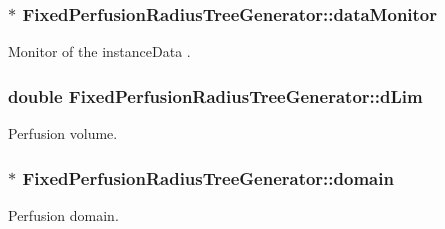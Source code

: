 \subsubsection[{\texorpdfstring{data\+Monitor}{dataMonitor}}]{$\ast$ Fixed\+Perfusion\+Radius\+Tree\+Generator\+::data\+Monitor\hspace{0.3cm}{\ttfamily [private]}}\hypertarget{class_fixed_perfusion_radius_tree_generator_a431e0e44437bc9cbee263ab316c8ed60}{}\label{class_fixed_perfusion_radius_tree_generator_a431e0e44437bc9cbee263ab316c8ed60}
Monitor of the {\ttfamily instance\+Data} . 
\subsubsection[{\texorpdfstring{d\+Lim}{dLim}}]{\setlength{\rightskip}{0pt plus 5cm}double Fixed\+Perfusion\+Radius\+Tree\+Generator\+::d\+Lim\hspace{0.3cm}{\ttfamily [private]}}\hypertarget{class_fixed_perfusion_radius_tree_generator_ae14a2fd89b3e87d51d8d304abab238be}{}\label{class_fixed_perfusion_radius_tree_generator_ae14a2fd89b3e87d51d8d304abab238be}
Perfusion volume. 
\subsubsection[{\texorpdfstring{domain}{domain}}]{$\ast$ Fixed\+Perfusion\+Radius\+Tree\+Generator\+::domain\hspace{0.3cm}{\ttfamily [private]}}\hypertarget{class_fixed_perfusion_radius_tree_generator_a3f613d457aa40ecbec9c61b0fd559764}{}\label{class_fixed_perfusion_radius_tree_generator_a3f613d457aa40ecbec9c61b0fd559764}
Perfusion domain. 
